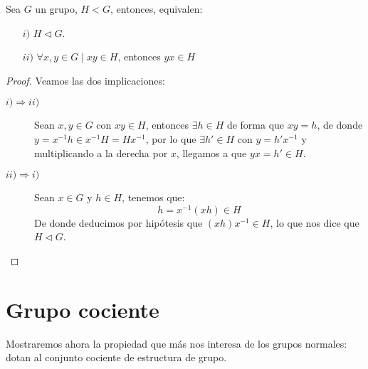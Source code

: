 \begin{prop}
    Sea $G$ un grupo, $H<G$, entonces, equivalen:
    \begin{enumerate}
        \item[$i)$] $H\lhd G$.
        \item[$ii)$] $\forall x,y\in G \mid xy \in H$, entonces $yx \in H$
    \end{enumerate}
    \begin{proof}
        Veamos las dos implicaciones:
        \begin{description}
            \item [$i)\Longrightarrow ii)$] Sean $x,y\in G$ con $xy\in H$, entonces $\exists h\in H$ de forma que $xy = h$, de donde $y = x^{-1}h \in x^{-1}H = Hx^{-1}$, por lo que $\exists h'\in H$ con $y = h'x^{-1}$ y multiplicando a la derecha por $x$, llegamos a que $yx = h' \in H$.
            \item [$ii)\Longrightarrow i)$] Sean $x\in G$ y $h\in H$, tenemos que:
                \begin{equation*}
                    h = x^{-1}(xh) \in H
                \end{equation*}
                De donde deducimos por hipótesis que $(xh)x^{-1} \in H$, lo que nos dice que $H\lhd G$.\qedhere
        \end{description}
    \end{proof}
\end{prop}

\section{Grupo cociente}
\noindent
Mostraremos ahora la propiedad que más nos interesa de los grupos normales: dotan al conjunto cociente de estructura de grupo.

